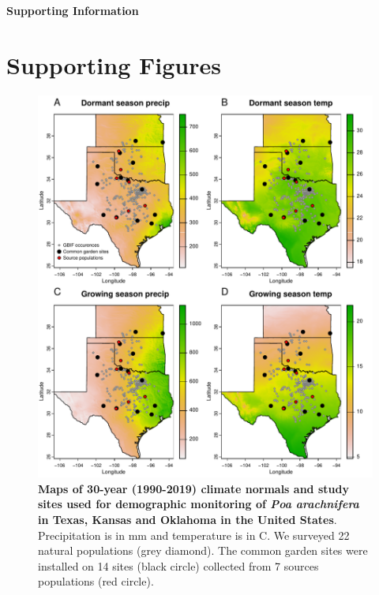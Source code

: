 \documentclass[12pt]{article}\usepackage[]{graphicx}\usepackage[dvipsnames]{xcolor}
\begin{document}
\newpage



\newpage
\clearpage 
\setcounter{equation}{0}
\setcounter{figure}{0}
\setcounter{section}{0}
\setcounter{table}{0}
\renewcommand{\theequation}{S.\arabic{equation}}
\renewcommand{\thetable}{S-\arabic{table}}
\renewcommand{\thefigure}{S-\arabic{figure}}
\renewcommand{\thesection}{S.\arabic{section}}

\centerline{\Large{\textbf{Supporting Information}}}



\section {Supporting Figures}

\begin{figure}[H]
  \begin{center}
    \includegraphics[width=0.9\linewidth]{Figures/POAR_survey_garden_map.pdf}
  \caption{\textbf{Maps of 30-year (1990-2019) climate normals and study sites used for demographic monitoring of \emph{Poa arachnifera} in Texas, Kansas and Oklahoma in the United States}.
  Precipitation is in mm and temperature is in \degree C.
  We surveyed 22 natural populations (grey diamond).
  The common garden sites were installed on 14 sites (black circle) collected from 7 sources populations (red circle).
  }
  \label{Sup:long_lat_garden}
  \end{center}
\end{figure}
\end{document}
